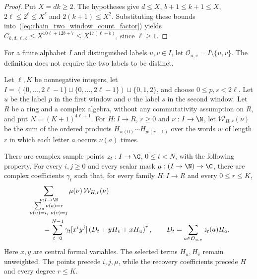 \begin{proof}\leanok
    Put $X=dk\ge2$. The hypotheses give $d\le X$,
    $b+1\le k+1\le X$, $2\ell\le2^\ell\le X^\ell$ and
    $2(k+1)\le X^2$. Substituting these bounds
    into~(\ref{eq:chain_two_window_count_factor}) yields
    $C_{k,d,\ell,b}\le X^{10\ell+12b+7}\le X^{17(\ell+b)}$, since $\ell\ge1$.
\end{proof}

\begin{definition}
    \label{def:two_marker_ordinary_labels}
    \leanok
    For a finite alphabet $I$ and distinguished labels $u,v\in I$, let
    $\mathcal O_{u,v}=I\setminus\{u,v\}$.
    The definition does not require the two labels to be distinct.
\end{definition}

\begin{lemma}
    \label{thm:two_window_common_scalar_recovery}
    \leanok
    Let $\ell,K$ be nonnegative integers, let
    $I=(\{0,\ldots,2\ell-1\}\sqcup\{0,\ldots,2\ell-1\})\sqcup\{0,1,2\}$,
    and choose $0\le p,s<2\ell$.
    Let $u$ be the label $p$ in the first window and $v$ the label $s$ in the
    second window. Let $R$ be a ring and a complex algebra, without any
    commutativity assumption on $R$, and put $N=(K+1)^{4\ell+1}$.
    For $H:I\to R$, $r\ge0$ and $\nu:I\to\N$, let $\mathcal W_{H,r}(\nu)$ be
    the sum of the ordered products $H_{w(0)}\cdots H_{w(r-1)}$ over the words
    $w$ of length $r$ in which each letter $a$ occurs $\nu(a)$ times.

    There are complex sample points $z_t:I\to\C$, $0\le t<N$, with the
    following property. For every $i,j\ge0$ and every scalar mask
    $\mu:(I\to\N)\to\C$, there are complex coefficients $\gamma_t$ such
    that, for every family $H:I\to R$ and every $0\le r\le K$,
    \begin{align}
         & \sum_{\substack{\nu:I\to\N                                   \\ \sum_a\nu(a)=r\\
                   \nu(u)=i,\ \nu(v)=j}}
        \mu(\nu)\,\mathcal W_{H,r}(\nu)\notag                                            \\
         & \qquad=\sum_{t=0}^{N-1}\gamma_t
                                  [x^iy^j]\left(D_t+yH_v+xH_u\right)^r,
        \qquad D_t=\sum_{a\in\mathcal O_{u,v}}z_t(a)H_a.
        \label{eq:two_window_common_scalar_recovery}
    \end{align}
    Here $x,y$ are central formal variables. The selected terms $H_u,H_v$
    remain unweighted. The points precede $i,j,\mu$, while the recovery
    coefficients precede $H$ and every degree $r\le K$.
\end{lemma}

